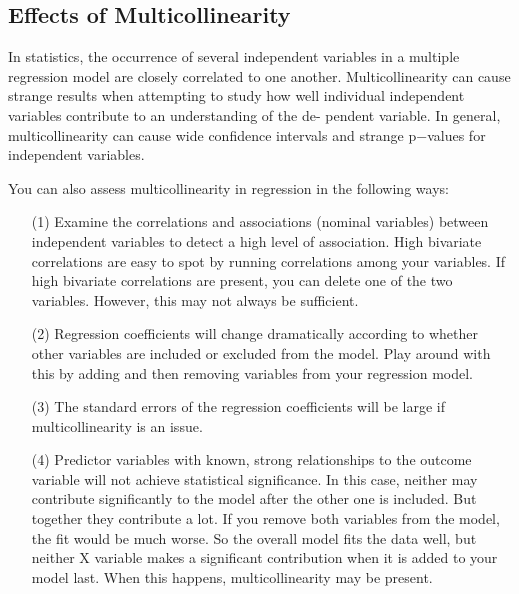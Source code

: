 \documentclass[a4paper,12pt]{article}
\begin{document}
\subsection{Effects of Multicollinearity}

In statistics, the occurrence of several independent variables in a multiple regression model are
closely correlated to one another. Multicollinearity can cause strange results when attempting
to study how well individual independent variables contribute to an understanding of the de-
pendent variable. In general, multicollinearity can cause wide confidence intervals and strange
p−values for independent variables.

\bigskip

You can also assess multicollinearity in regression in the following ways:

\begin{itemize}
\item [(1)] Examine the correlations and associations (nominal variables) between independent variables to detect a high level of association. High bivariate correlations are easy to spot by running correlations among your variables. If high bivariate correlations are present, you can delete one of the two variables. However, this may not always be sufficient.

\item [(2)] Regression coefficients will change dramatically according to whether other variables are included or excluded from the model. Play around with this by adding and then removing variables from your regression model.

\item [(3)] The standard errors of the regression coefficients will be large if multicollinearity is an issue.

\item [(4)] Predictor variables with known, strong relationships to the outcome variable will not achieve statistical significance. In this case, neither may contribute significantly to the model after the other one is included. But together they contribute a lot. If you remove both variables from the model, the fit would be much worse. So the overall model fits the data well, but neither X variable makes a significant contribution when it is added to your model last. When this happens, multicollinearity may be present.

\end{itemize}
\end{document}
